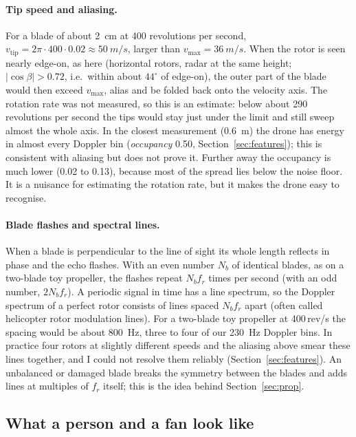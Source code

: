 \documentclass[11pt,a4paper]{article}
\newcommand{\vmax}{v_{\max}}
\begin{document}
\paragraph{Tip speed and aliasing.} For a blade of about \SI{2}{cm} at 400 revolutions per second, $v_{\mathrm{tip}} = 2\pi \cdot 400 \cdot 0.02 \approx \SI{50}{m/s}$, larger than $\vmax = \SI{36}{m/s}$. When the rotor is seen nearly edge-on, as here (horizontal rotors, radar at the same height; $|\cos\beta| > 0.72$, i.e.\ within about $44^\circ$ of edge-on), the outer part of the blade would then exceed $\vmax$, alias and be folded back onto the velocity axis. The rotation rate was not measured, so this is an estimate: below about 290 revolutions per second the tips would stay just under the limit and still sweep almost the whole axis. In the closest measurement (\SI{0.6}{m}) the drone has energy in almost every Doppler bin (\emph{occupancy} 0.50, Section~\ref{sec:features}); this is consistent with aliasing but does not prove it. Further away the occupancy is much lower (0.02 to 0.13), because most of the spread lies below the noise floor. It is a nuisance for estimating the rotation rate, but it makes the drone easy to recognise.

\paragraph{Blade flashes and spectral lines.} When a blade is perpendicular to the line of sight its whole length reflects in phase and the echo flashes. With an even number $N_b$ of identical blades, as on a two-blade toy propeller, the flashes repeat $N_b f_r$ times per second (with an odd number, $2N_b f_r$). A periodic signal in time has a line spectrum, so the Doppler spectrum of a perfect rotor consists of lines spaced $N_b f_r$ apart (often called helicopter rotor modulation lines). For a two-blade toy propeller at 400\,rev/s the spacing would be about \SI{800}{Hz}, three to four of our \SI{230}{Hz} Doppler bins. In practice four rotors at slightly different speeds and the aliasing above smear these lines together, and I could not resolve them reliably (Section~\ref{sec:features}). An unbalanced or damaged blade breaks the symmetry between the blades and adds lines at multiples of $f_r$ itself; this is the idea behind Section~\ref{sec:prop}.

\subsection{What a person and a fan look like}
\end{document}
